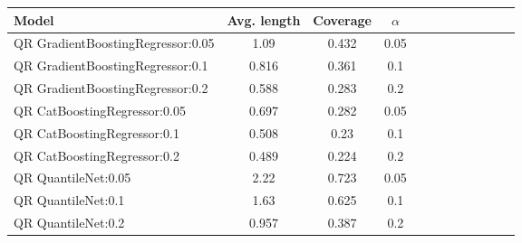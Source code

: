 \begin{table}[t] 
\centering 
\small 
\begin{tabular}{lccccccccccc} 
\toprule 
Model & Avg. length & Coverage & $\alpha$ \\ 
\midrule 
 QR GradientBoostingRegressor:0.05 & 1.09 & 0.432 & 0.05  \\ 
 QR GradientBoostingRegressor:0.1 & 0.816 & 0.361 & 0.1  \\ 
 QR GradientBoostingRegressor:0.2 & 0.588 & 0.283 & 0.2  \\ 
 QR CatBoostingRegressor:0.05 & 0.697 & 0.282 & 0.05  \\ 
 QR CatBoostingRegressor:0.1 & 0.508 & 0.23 & 0.1  \\ 
 QR CatBoostingRegressor:0.2 & 0.489 & 0.224 & 0.2  \\ 
 QR QuantileNet:0.05 & 2.22 & 0.723 & 0.05  \\ 
 QR QuantileNet:0.1 & 1.63 & 0.625 & 0.1  \\ 
 QR QuantileNet:0.2 & 0.957 & 0.387 & 0.2  \\ 
\bottomrule 
\end{tabular} 
\end{table} 
